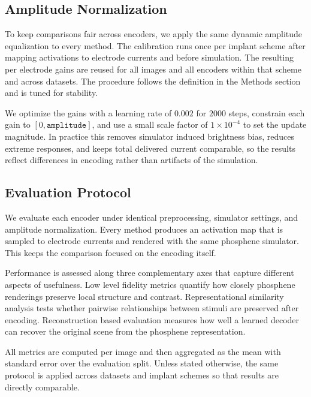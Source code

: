\subsection{Amplitude Normalization}
To keep comparisons fair across encoders, we apply the same dynamic amplitude equalization to every method. The calibration runs once per implant scheme after mapping activations to electrode currents and before simulation. The resulting per electrode gains are reused for all images and all encoders within that scheme and across datasets. The procedure follows the definition in the Methods section and is tuned for stability.

We optimize the gains with a learning rate of \(0.002\) for \(2000\) steps, constrain each gain to \([0,\texttt{amplitude}]\), and use a small scale factor of \(1\times10^{-4}\) to set the update magnitude. In practice this removes simulator induced brightness bias, reduces extreme responses, and keeps total delivered current comparable, so the results reflect differences in encoding rather than artifacts of the simulation.


\subsection{Evaluation Protocol}
We evaluate each encoder under identical preprocessing, simulator settings, and amplitude normalization. Every method produces an activation map that is sampled to electrode currents and rendered with the same phosphene simulator. This keeps the comparison focused on the encoding itself.

Performance is assessed along three complementary axes that capture different aspects of usefulness. Low level fidelity metrics quantify how closely phosphene renderings preserve local structure and contrast. Representational similarity analysis tests whether pairwise relationships between stimuli are preserved after encoding. Reconstruction based evaluation measures how well a learned decoder can recover the original scene from the phosphene representation.

All metrics are computed per image and then aggregated as the mean with standard error over the evaluation split. Unless stated otherwise, the same protocol is applied across datasets and implant schemes so that results are directly comparable.

